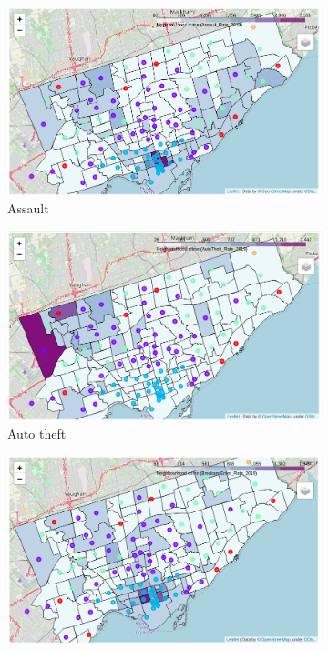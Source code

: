 \documentclass{article}
\begin{document}
\begin{figure}[ht]
     \centering
     \begin{subfigure}[b]{0.47\textwidth}
         \centering
         \includegraphics[width=\textwidth]{pics/assault2}
         \caption{Assault}
     \end{subfigure}
     \hfill
     \begin{subfigure}[b]{0.47\textwidth}
         \centering
         \includegraphics[width=\textwidth]{pics/auto}
         \caption{Auto theft}
     \end{subfigure}
     \begin{subfigure}[b]{0.47\textwidth}
         \centering
         \includegraphics[width=\textwidth]{pics/breakenter}

\end{subfigure}
\end{figure}
\end{document}
